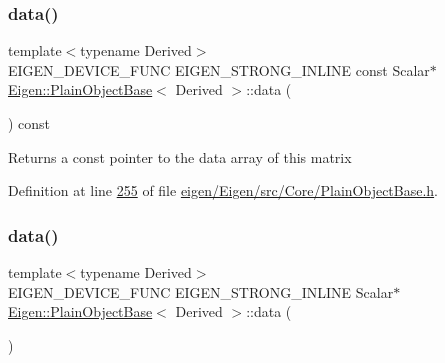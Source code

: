 \mbox{\label{class_eigen_1_1_plain_object_base_ac25699535374b1854cf8494e44ad31b2}} 
\subsubsection{\texorpdfstring{data()}{data()}\hspace{0.1cm}{\footnotesize\ttfamily [2/4]}}
{\footnotesize\ttfamily template$<$typename Derived$>$ \\
E\+I\+G\+E\+N\+\_\+\+D\+E\+V\+I\+C\+E\+\_\+\+F\+U\+NC E\+I\+G\+E\+N\+\_\+\+S\+T\+R\+O\+N\+G\+\_\+\+I\+N\+L\+I\+NE const Scalar$\ast$ \hyperlink{class_eigen_1_1_plain_object_base}{Eigen\+::\+Plain\+Object\+Base}$<$ Derived $>$\+::data (\begin{DoxyParamCaption}{ }\end{DoxyParamCaption}) const\hspace{0.3cm}{\ttfamily [inline]}}

\begin{DoxyReturn}{Returns}
a const pointer to the data array of this matrix 
\end{DoxyReturn}


Definition at line \hyperlink{eigen_2_eigen_2src_2_core_2_plain_object_base_8h_source_l00255}{255} of file \hyperlink{eigen_2_eigen_2src_2_core_2_plain_object_base_8h_source}{eigen/\+Eigen/src/\+Core/\+Plain\+Object\+Base.\+h}.

\mbox{\label{class_eigen_1_1_plain_object_base_a54ed64f45b2f5e852355d5e2311810bd}} 
\subsubsection{\texorpdfstring{data()}{data()}\hspace{0.1cm}{\footnotesize\ttfamily [3/4]}}
{\footnotesize\ttfamily template$<$typename Derived$>$ \\
E\+I\+G\+E\+N\+\_\+\+D\+E\+V\+I\+C\+E\+\_\+\+F\+U\+NC E\+I\+G\+E\+N\+\_\+\+S\+T\+R\+O\+N\+G\+\_\+\+I\+N\+L\+I\+NE Scalar$\ast$ \hyperlink{class_eigen_1_1_plain_object_base}{Eigen\+::\+Plain\+Object\+Base}$<$ Derived $>$\+::data (\begin{DoxyParamCaption}{ }\end{DoxyParamCaption})\hspace{0.3cm}{\ttfamily [inline]}}

